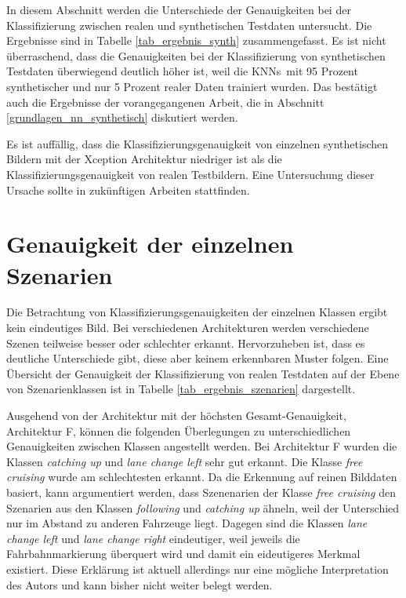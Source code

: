 In diesem Abschnitt werden die Unterschiede der Genauigkeiten bei der Klassifizierung zwischen realen und synthetischen Testdaten untersucht. Die Ergebnisse sind in Tabelle \ref{tab_ergebnis_synth} zusammengefasst. Es ist nicht überraschend, dass die Genauigkeiten bei der Klassifizierung von synthetischen Testdaten überwiegend deutlich höher ist, weil die \acp{KNN} mit 95 Prozent synthetischer und nur 5 Prozent realer Daten trainiert wurden. Das bestätigt auch die Ergebnisse der vorangegangenen Arbeit, die in Abschnitt \ref{grundlagen_nn_synthetisch} diskutiert werden. 

Es ist auffällig, dass die Klassifizierungsgenauigkeit von einzelnen synthetischen Bildern mit der Xception Architektur niedriger ist als die Klassifizierungsgenauigkeit von realen Testbildern. Eine Untersuchung dieser Ursache sollte in zukünftigen Arbeiten stattfinden.


\section{Genauigkeit der einzelnen Szenarien}
\label{ergebnis_szenarien}

Die Betrachtung von Klassifizierungsgenauigkeiten der einzelnen Klassen ergibt kein eindeutiges Bild. Bei verschiedenen Architekturen werden verschiedene Szenen teilweise besser oder schlechter erkannt. Hervorzuheben ist, dass es deutliche Unterschiede gibt, diese aber keinem erkennbaren Muster folgen. Eine Übersicht der Genauigkeit der Klassifizierung von realen Testdaten auf der Ebene von Szenarienklassen ist in Tabelle \ref{tab_ergebnis_szenarien} dargestellt.

Ausgehend von der Architektur mit der höchsten Gesamt-Genauigkeit, Architektur F, können die folgenden Überlegungen zu unterschiedlichen Genauigkeiten zwischen Klassen angestellt werden. Bei Architektur F wurden die Klassen \textit{catching up} und \textit{lane change left} sehr gut erkannt. Die Klasse \textit{free cruising} wurde am schlechtesten erkannt. Da die Erkennung auf reinen Bilddaten basiert, kann argumentiert werden, dass Szenenarien der Klasse \textit{free cruising} den Szenarien aus den Klassen \textit{following} und \textit{catching up} ähneln, weil der Unterschied nur im Abstand zu anderen Fahrzeuge liegt. Dagegen sind die Klassen \textit{lane change left} und \textit{lane change right} eindeutiger, weil jeweils die Fahrbahnmarkierung überquert wird und damit ein eideutigeres Merkmal existiert. Diese Erklärung ist aktuell allerdings nur eine mögliche Interpretation des Autors und kann bisher nicht weiter belegt werden. 


